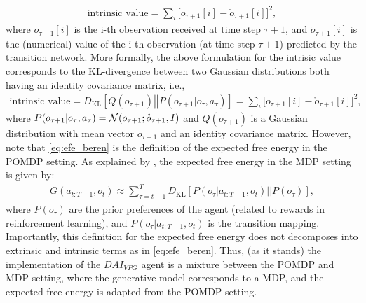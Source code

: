 \documentclass[twoside,11pt]{article}
\let\oldmathcal\mathcal
\renewcommand{\mathcal}[1]{%
  \IfSubStr{ABCDEFGHIJKLMNOPQRSTUVWXYZ}{#1}{\oldmathcal{#1}}{\mathdutchcal{#1}}
}
\newcommand{\kl}[2]{D_{\mathrm{KL}} \left[ \left. \left. #1 \right|\right| #2 \right] }
\begin{document}
\begin{align}
\text{intrinsic value} = \sum_{i} \Big[ o_{\tau+1}[i] - \mathring{o}_{\tau+1}[i] \Big]^2, \label{eq:intrisic_values}
\end{align}
where $o_{\tau+1}[i]$ is the i-th observation received at time step $\tau + 1$, and $\mathring{o}_{\tau+1}[i]$ is the (numerical) value of the i-th observation (at time step $\tau + 1$) predicted by the transition network. More formally, the above formulation for the intrisic value corresponds to the KL-divergence between two Gaussian distributions both having an identity covariance matrix, i.e.,
\begin{align*}
\text{intrinsic value} = \kl{Q(o_{\tau+1})}{P(o_{\tau+1}|o_\tau, a_\tau)} = \sum_{i} \Big[ o_{\tau+1}[i] - \mathring{o}_{\tau+1}[i] \Big]^2,
\end{align*}
where $P(o_{\tau+1}|o_\tau, a_\tau) = \mathcal{N}(o_{\tau+1};\mathring{o}_{\tau+1},I)$ and $Q(o_{\tau+1})$ is a Gaussian distribution with mean vector $o_{\tau+1}$ and an identity covariance matrix. However, note that \eqref{eq:efe_beren} is the definition of the expected free energy in the POMDP setting. As explained by \citet{dacosta2020relationship}, the expected free energy in the MDP setting is given by:
\begin{align*}
G(a_{t:T-1},o_t) \approx \sum_{\tau = t+1}^T \kl{P(o_\tau|a_{t:T-1}, o_t)}{P(o_\tau)},
\end{align*}
where $P(o_\tau)$ are the prior preferences of the agent (related to rewards in reinforcement learning), and $P(o_\tau |a_{t:T-1}, o_t)$ is the transition mapping. Importantly, this definition for the expected free energy does not decomposes into extrinsic and intrinsic terms as in \eqref{eq:efe_beren}. Thus, (as it stands) the implementation of the $DAI_{VPG}$ agent is a mixture between the POMDP and MDP setting, where the generative model corresponds to a MDP, and the expected free energy is adapted from the POMDP setting.
\end{document}
